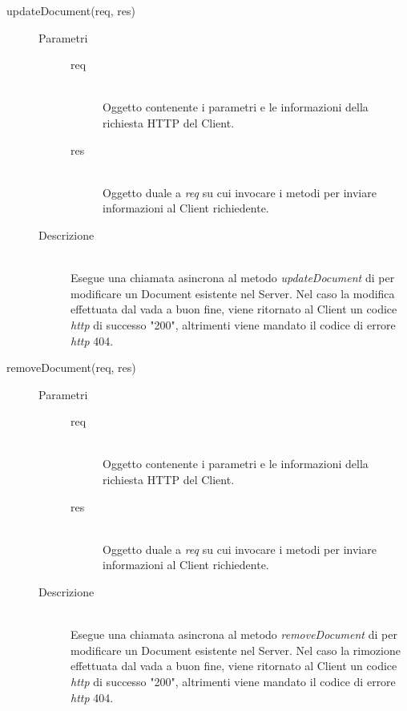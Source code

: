 \begin{description}
\begin{description}
 \item[updateDocument(req, res)] \hfill 
 \begin{description}
 \item[Parametri] \hfill
  \begin{description}
   \item[req] \hfill \\
   Oggetto contenente i parametri e le informazioni della richiesta HTTP del Client.
   \item[res] \hfill \\
   Oggetto duale a \textit{req} su cui invocare i metodi per inviare informazioni al Client richiedente.
  \end{description}
 \item[Descrizione] \hfill \\
 Esegue una chiamata asincrona al metodo \textit{updateDocument} di  per modificare un Document esistente nel Server. Nel caso la modifica effettuata dal  vada a buon fine, viene ritornato al Client un codice \textit{http} di successo "200", altrimenti viene mandato il codice di errore \textit{http} 404.
 \end{description}
 
 \item[removeDocument(req, res)] \hfill 
 \begin{description}
 \item[Parametri] \hfill
  \begin{description}
   \item[req] \hfill \\
   Oggetto contenente i parametri e le informazioni della richiesta HTTP del Client.
   \item[res] \hfill \\
   Oggetto duale a \textit{req} su cui invocare i metodi per inviare informazioni al Client richiedente.
  \end{description}
 \item[Descrizione] \hfill \\
 Esegue una chiamata asincrona al metodo \textit{removeDocument} di  per modificare un Document esistente nel Server. Nel caso la rimozione effettuata dal  vada a buon fine, viene ritornato al Client un codice \textit{http} di successo "200", altrimenti viene mandato il codice di errore \textit{http} 404.
 \end{description}
 
 \end{description}
 
\end{description} %


